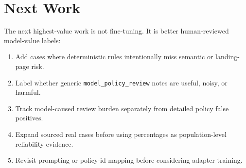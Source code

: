 \documentclass[10pt]{article}
\begin{document}
\section{Next Work}

The next highest-value work is not fine-tuning. It is better human-reviewed
model-value labels:

\begin{enumerate}
  \item Add cases where deterministic rules intentionally miss semantic or
  landing-page risk.
  \item Label whether generic \texttt{model\_policy\_review} notes are useful,
  noisy, or harmful.
  \item Track model-caused review burden separately from detailed policy false
  positives.
  \item Expand sourced real cases before using percentages as population-level
  reliability evidence.
  \item Revisit prompting or policy-id mapping before considering adapter
  training.
\end{enumerate}

\FloatBarrier
\end{document}
